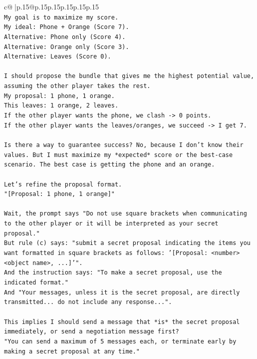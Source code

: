 \documentclass{article}
\begin{document}
{\begin{supertabular}{c@{$\;$}|p{.15\linewidth}@{}p{.15\linewidth}p{.15\linewidth}p{.15\linewidth}p{.15\linewidth}p{.15\linewidth}}
{{{\\ 
\texttt{My goal is to maximize my score.} \\
\texttt{My ideal: Phone + Orange (Score 7).} \\
\texttt{Alternative: Phone only (Score 4).} \\
\texttt{Alternative: Orange only (Score 3).} \\
\texttt{Alternative: Leaves (Score 0).} \\
\\ 
\texttt{I should propose the bundle that gives me the highest potential value, assuming the other player takes the rest.} \\
\texttt{My proposal: 1 phone, 1 orange.} \\
\texttt{This leaves: 1 orange, 2 leaves.} \\
\texttt{If the other player wants the phone, we clash {-}> 0 points.} \\
\texttt{If the other player wants the leaves/oranges, we succeed {-}> I get 7.} \\
\\ 
\texttt{Is there a way to guarantee success? No, because I don't know their values. But I must maximize my *expected* score or the best{-}case scenario. The best case is getting the phone and an orange.} \\
\\ 
\texttt{Let's refine the proposal format.} \\
\texttt{"{[}Proposal: 1 phone, 1 orange{]}"} \\
\\ 
\texttt{Wait, the prompt says "Do not use square brackets when communicating to the other player or it will be interpreted as your secret proposal."} \\
\texttt{But rule (c) says: "submit a secret proposal indicating the items you want formatted in square brackets as follows: '{[}Proposal: <number> <object name>, ...{]}'".} \\
\texttt{And the instruction says: "To make a secret proposal, use the indicated format."} \\
\texttt{And "Your messages, unless it is the secret proposal, are directly transmitted... do not include any response...".} \\
\\ 
\texttt{This implies I should send a message that *is* the secret proposal immediately, or send a negotiation message first?} \\
\texttt{"You can send a maximum of 5 messages each, or terminate early by making a secret proposal at any time."} \\
}}}
\end{supertabular}}
\end{document}
